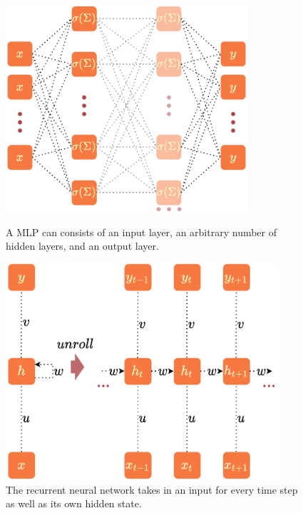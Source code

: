\documentclass[a4paper,cleardoubleempty,BCOR1cm, 11pt]{report}
\begin{document}
\begin{figure}
	\centering
	\begin{minipage}[t]{0.45\textwidth}
		\centering
		\includegraphics[width=0.8\textwidth,height=0.21\textheight]{images/mlp.pdf} 
		\caption{A MLP can consists of an input layer, an arbitrary number of hidden layers, and an output layer.}
	\end{minipage}\hfill
	\begin{minipage}[t]{0.45\textwidth}
		\centering
		\includegraphics[width=0.9\textwidth,height=0.20\textheight]{images/rnn.pdf}
		
		\caption{The recurrent neural network takes in an input for every time step as well as its own hidden state.}
		\label{fig:rnn}
	\end{minipage}
\end{figure}
\end{document}
